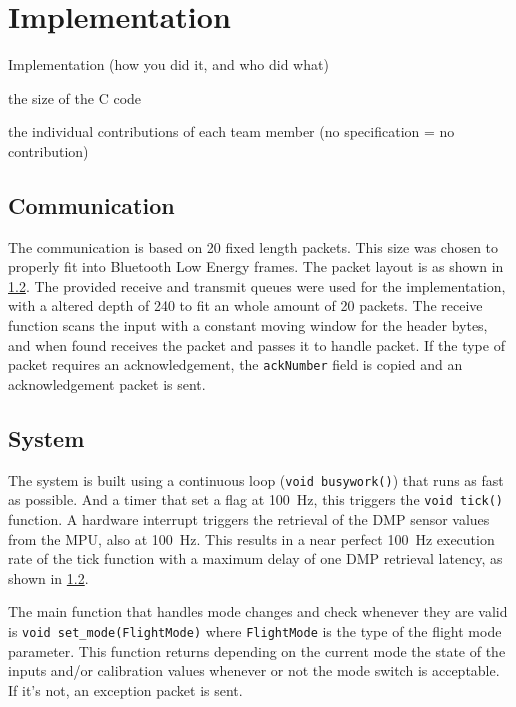 \documentclass[final]{article}
\begin{document}
\section{Implementation}
\label{sec:implmentation}
Implementation (how you did it, and who did what)

the size of the C code

the individual contributions of each team member (no specification = no contribution)


\subsection{Communication}
The communication is based on \SI{20}{\byte} fixed length packets.
This size was chosen to properly fit into Bluetooth Low Energy frames.
The packet layout is as shown in \cref{}. %
The provided receive and transmit queues were used for the implementation, with a altered depth of \num{240} to fit an whole amount of \SI{20}{\byte} packets.
The receive function scans the input with a constant moving window for the header bytes, and when found receives the packet and passes it to handle packet.
If the type of packet requires an acknowledgement, the \texttt{ackNumber} field is copied and an acknowledgement packet is sent.


\subsection{System}
The system is built using a continuous loop (\texttt{void busywork()}) that runs as fast as possible.
And a timer that set a flag at \SI{100}{\hertz}, this triggers the \texttt{void tick()} function.
A hardware interrupt triggers the retrieval of the DMP sensor values from the MPU, also at \SI{100}{\hertz}.
This results in a near perfect \SI{100}{\hertz} execution rate of the tick function with a maximum delay of one DMP retrieval latency, as shown in \cref{}. %

The main function that handles mode changes and check whenever they are valid is \texttt{void set\_mode(FlightMode)} where \texttt{FlightMode} is the type of the flight mode parameter.
This function returns depending on the current mode the state of the inputs and/or calibration values whenever or not the mode switch is acceptable.
If it's not, an exception packet is sent.
\end{document}
